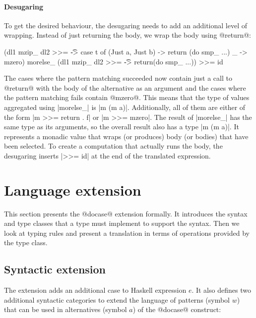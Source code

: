 \documentclass[preprint]{sigplanconf}
\begin{document}
\paragraph{Desugaring} To get the desired behaviour, the desugaring needs to add an additional
level of wrapping. Instead of just returning the body, we wrap the body using @return@:

\begin{code}
(dl1 mzip_ dl2 >>= \t -> case t of 
    (Just a, Just b) -> return (do smp_ ...)
    _ -> mzero) morelse_
(dl1 mzip_ dl2 >>= \t -> 
    return(do smp_ ...)) >>= id
\end{code}
The cases where the pattern matching succeeded now contain just a call to @return@ with the body
of the alternative as an argument and the cases where the pattern matching fails contain @mzero@.
This means that the type of values aggregated using |morelse_| is |m (m a)|. Additionally,
all of them are either of the form |m >>= return . f| or |m >>= mzero|.
The result of |morelse_| has the same type as its arguments, so the overall result also has a type
|m (m a)|. It represents a monadic value that wraps (or produces) body (or bodies) that have
been selected. To create a computation that actually runs the body, the desugaring inserts 
|>>= id| at the end of the translated expression. 


\section{Language extension}
\label{sec:extension}

This section presents the @docase@ extension formally. It introduces the syntax and type classes
that a type must implement to support the syntax. Then we look at typing rules and present a 
translation in terms of operations provided by the  type class.


\subsection{Syntactic extension}
\label{sec:extension-syntax}

The extension adds an additional case to Haskell expression $e$. It also 
defines two additional syntactic categories to extend the language of patterns (symbol $w$) that 
can be used in alternatives (symbol $a$) of the @docase@ construct:
\end{document}
